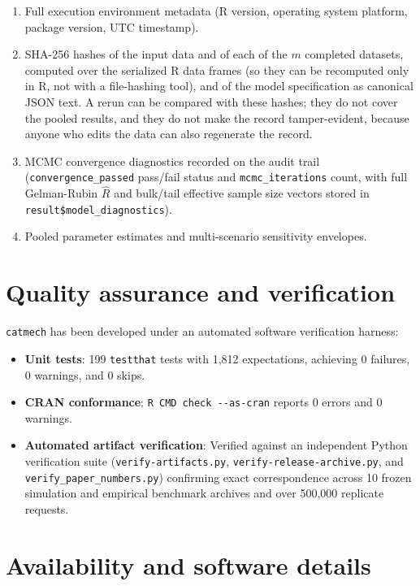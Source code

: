 \documentclass[
]{article}
\providecommand{\tightlist}{%
  \setlength{\itemsep}{0pt}\setlength{\parskip}{0pt}}
\begin{document}
\begin{enumerate}
\def\labelenumi{\arabic{enumi}.}
\tightlist
\item
  Full execution environment metadata (R version, operating system
  platform, package version, UTC timestamp).
\item
  SHA-256 hashes of the input data and of each of the \(m\) completed
  datasets, computed over the serialized R data frames (so they can be
  recomputed only in R, not with a file-hashing tool), and of the model
  specification as canonical JSON text. A rerun can be compared with
  these hashes; they do not cover the pooled results, and they do not
  make the record tamper-evident, because anyone who edits the data can
  also regenerate the record.
\item
  MCMC convergence diagnostics recorded on the audit trail
  (\texttt{convergence\_passed} pass/fail status and
  \texttt{mcmc\_iterations} count, with full Gelman-Rubin \(\hat{R}\)
  and bulk/tail effective sample size vectors stored in
  \texttt{result\$model\_diagnostics}).
\item
  Pooled parameter estimates and multi-scenario sensitivity envelopes.
\end{enumerate}

\section{Quality assurance and
verification}\label{quality-assurance-and-verification}

\texttt{catmech} has been developed under an automated software
verification harness:

\begin{itemize}
\tightlist
\item
  \textbf{Unit tests}: 199 \texttt{testthat} tests with 1,812
  expectations, achieving 0 failures, 0 warnings, and 0 skips.
\item
  \textbf{CRAN conformance}: \texttt{R\ CMD\ check\ -\/-as-cran} reports
  0 errors and 0 warnings.
\item
  \textbf{Automated artifact verification}: Verified against an
  independent Python verification suite (\texttt{verify-artifacts.py},
  \texttt{verify-release-archive.py}, and
  \texttt{verify\_paper\_numbers.py}) confirming exact correspondence
  across 10 frozen simulation and empirical benchmark archives and over
  500,000 replicate requests.
\end{itemize}

\section{Availability and software
details}\label{availability-and-software-details}
\end{document}
